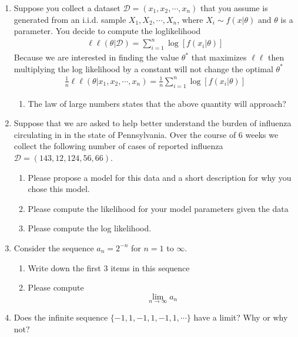 \begin{enumerate}
    \item Suppose you collect a dataset $\mathcal{D} = (x_{1},x_{2},\cdots,x_{n})$ that you assume is generated from an i.i.d. sample $X_{1}, X_{2},\cdots, X_{n}$, where $X_{i} \sim f(x | \theta)$ and $\theta$ is a parameter.
    You decide to compute the loglikelihood
    \begin{align}
        \ell \ell (\theta | \mathcal{D}) = \sum_{i=1}^{n} \log \left [ f(x_{i} | \theta) \right]
    \end{align}
    Because we are interested in finding the value $\theta^{*}$ that maximizes $\mathcal{\ell \ell}$ then multiplying the log likelihood by a constant will not change the optimal $\theta^{*}$
    \begin{align}
        \frac{1}{n} \ell \ell (\theta | x_{1}, x_{2}, \cdots, x_{n}) = \frac{1}{n} \sum_{i=1}^{n} \log \left [ f(x_{i} | \theta) \right]
    \end{align}
    \begin{enumerate}
        \item The law of large numbers states that the above quantity will approach?   
    \end{enumerate}
    
    \item Suppose that we are asked to help better understand the burden of influenza circulating in in the state of Pennsylvania. 
    Over the course of 6 weeks we collect the following number of cases of reported influenza $\mathcal{D} = (143, 12, 124, 56, 66)$. 
    \begin{enumerate}
        \item Please propose a model for this data and a short description for why you chose this model. 
        \item Please compute the likelihood for your model parameters given the data
        \item Please compute the log likelihood.
    \end{enumerate}
    
    \item Consider the sequence $a_{n} = 2^{-n}$ for $n=1$ to $\infty$. 
    \begin{enumerate}
        \item Write down the first 3 items in this sequence 
        \item Please compute \[ \lim_{n \to \infty} a_{n} \]
    \end{enumerate}
    
    \item Does the infinite sequence $\{-1,1,-1,1,-1,1, \cdots \}$ have a limit? Why or why not? 
    

\end{enumerate}

